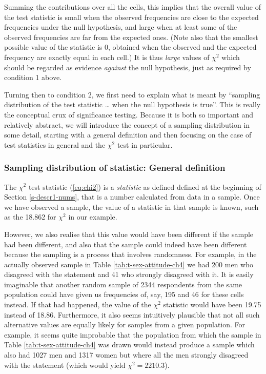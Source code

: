 \documentclass[11pt,a4paper,openany]{book}
\begin{document}
Summing the contributions over all the cells, this implies that the
overall value of the test statistic is small when the observed
frequencies are close to the expected frequencies under the null
hypothesis, and large when at least some of the observed frequencies are
far from the expected ones. (Note also that the smallest possible value
of the statistic is 0, obtained when the observed and the expected
frequency are exactly equal in each cell.) It is thus \emph{large}
values of \(\chi^{2}\) which should be regarded as evidence
\emph{against} the null hypothesis, just as required by condition 1
above.

Turning then to condition 2, we first need to explain what is meant by
``sampling distribution of the test statistic \ldots{} when the null
hypothesis is true''. This is really the conceptual crux of significance
testing. Because it is both so important and relatively abstract, we
will introduce the concept of a sampling distribution in some detail,
starting with a general definition and then focusing on the case of test
statistics in general and the \(\chi^{2}\) test in particular.

\subsubsection*{Sampling distribution of statistic: General
definition}\label{sampling-distribution-of-statistic-general-definition}

The \(\chi^{2}\) test statistic (\ref{eq:chi2}) is a \emph{statistic} as
defined defined at the beginning of Section \ref{s-descr1-nums}, that is
a number calculated from data in a sample. Once we have observed a
sample, the value of a statistic in that sample is known, such as the
18.862 for \(\chi^{2}\) in our example.

However, we also realise that this value would have been different if
the sample had been different, and also that the sample could indeed
have been different because the sampling is a process that involves
randomness. For example, in the actually observed sample in Table
\ref{tab:t-sex-attitude-ch4} we had 200 men who disagreed with the
statement and 41 who strongly disagreed with it. It is easily imaginable
that another random sample of 2344 respondents from the same population
could have given us frequencies of, say, 195 and 46 for these cells
instead. If that had happened, the value of the \(\chi^{2}\) statistic
would have been 19.75 instead of 18.86. Furthermore, it also seems
intuitively plausible that not all such alternative values are equally
likely for samples from a given population. For example, it seems quite
improbable that the population from which the sample in Table
\ref{tab:t-sex-attitude-ch4} was drawn would instead produce a sample
which also had 1027 men and 1317 women but where all the men strongly
disagreed with the statement (which would yield \(\chi^{2}=2210.3\)).
\end{document}

